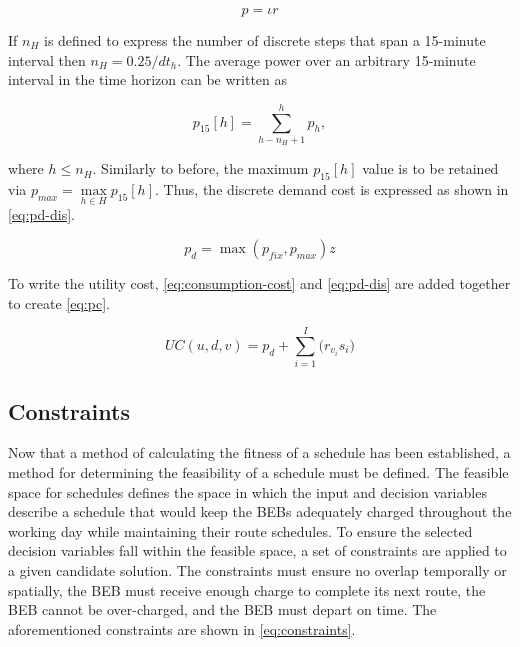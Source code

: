\documentclass[11pt,a4paper,final]{article}
\newcommand{\UC}{UC(u, d, v)}               %
\begin{document}
\begin{equation}
\label{eq:discrete-power}
  p = \iota r
\end{equation}

If \(n_H\) is defined to express the number of discrete steps that span a 15-minute interval then \(n_H = 0.25/dt_h\). The
average power over an arbitrary 15-minute interval in the time horizon can be written as

\begin{equation}
p_{15}[h] = \sum_{h-n_H+1}^h p_h,
\end{equation}

where \(h \le n_H\). Similarly to before, the maximum \(p_{15}[h]\) value is to be retained via \(p_{max} = \max\limits_{h \in
H}p_{15}[h]\). Thus, the discrete demand cost is expressed as shown in \ref{eq:pd-dis}.

\begin{equation}
\label{eq:pd-dis}
  p_d = \max(p_{fix}, p_{max})z
\end{equation}

To write the utility cost, \ref{eq:consumption-cost} and \ref{eq:pd-dis} are added together to create \ref{eq:pc}.

\begin{equation}
\label{eq:pc}
\UC = p_d + \sum_{i=1}^I \Big( r_{v_i}s_i \Big)
\end{equation}

\subsection{Constraints}
\label{sec:constraints}
Now that a method of calculating the fitness of a schedule has been established, a method for determining the
feasibility of a schedule must be defined. The feasible space for schedules defines the space in which the input and
decision variables describe a schedule that would keep the BEBs adequately charged throughout the working day while
maintaining their route schedules. To ensure the selected decision variables fall within the feasible space, a set of
constraints are applied to a given candidate solution. The constraints must ensure no overlap temporally or spatially,
the BEB must receive enough charge to complete its next route, the BEB cannot be over-charged, and the BEB must depart
on time. The aforementioned constraints are shown in \ref{eq:constraints}.
\end{document}
